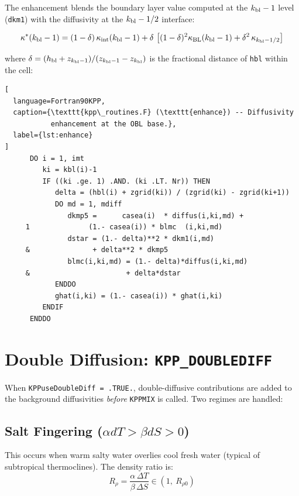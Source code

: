 \documentclass[12pt,letterpaper]{article}
\newcommand{\hbl}{h_{\mathrm{bl}}}
\begin{document}
The enhancement blends the boundary layer value computed at the  
$k_{\rm bl}-1$ level (\texttt{dkm1}) with the diffusivity at the  
$k_{\rm bl}-1/2$ interface:  
  
\begin{equation}  
\kappa^*(k_{\rm bl}-1) = (1-\delta)\,\kappa_{\rm int}(k_{\rm bl}-1)  
+ \delta\,\left[(1-\delta)^2 \kappa_{\rm BL}(k_{\rm bl}-1)  
+ \delta^2\,\kappa_{k_{\rm bl}-1/2}\right]  
\end{equation}  
  
where $\delta = (\hbl + z_{k_{\rm bl}-1}) / (z_{k_{\rm bl}-1} -  
z_{k_{\rm bl}})$ is the fractional distance of \texttt{hbl} within  
the cell:  
  
\begin{lstlisting}[  
  language=Fortran90KPP,  
  caption={\texttt{kpp\_routines.F} (\texttt{enhance}) -- Diffusivity  
           enhancement at the OBL base.},  
  label={lst:enhance}  
]  
      DO i = 1, imt  
         ki = kbl(i)-1  
         IF ((ki .ge. 1) .AND. (ki .LT. Nr)) THEN  
            delta = (hbl(i) + zgrid(ki)) / (zgrid(ki) - zgrid(ki+1))  
            DO md = 1, mdiff  
               dkmp5 =      casea(i)  * diffus(i,ki,md) +  
     1              (1.- casea(i)) * blmc  (i,ki,md)  
               dstar = (1.- delta)**2 * dkm1(i,md)  
     &               + delta**2 * dkmp5  
               blmc(i,ki,md) = (1.- delta)*diffus(i,ki,md)  
     &                       + delta*dstar  
            ENDDO  
            ghat(i,ki) = (1.- casea(i)) * ghat(i,ki)  
         ENDIF  
      ENDDO  
\end{lstlisting}  
  
\section{Double Diffusion: \texttt{KPP\_DOUBLEDIFF}}  
  
When \texttt{KPPuseDoubleDiff = .TRUE.}, double-diffusive contributions  
are added to the background diffusivities \textit{before} \texttt{KPPMIX}  
is called. Two regimes are handled:  
  
\subsection{Salt Fingering ($\alpha dT > \beta dS > 0$)}  
  
This occurs when warm salty water overlies cool fresh water (typical of  
subtropical thermoclines). The density ratio is:  
\begin{equation}  
R_\rho = \frac{\alpha\,\Delta T}{\beta\,\Delta S}  
\in (1,\ R_{\rho 0})  
\end{equation}  
  
\end{document}
